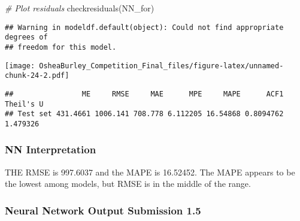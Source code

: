 \documentclass[
]{article}
\newenvironment{Shaded}{\begin{snugshade}}{\end{snugshade}}
\newcommand{\CommentTok}[1]{\textcolor[rgb]{0.56,0.35,0.01}{\textit{#1}}}
\newcommand{\FunctionTok}[1]{\textcolor[rgb]{0.00,0.00,0.00}{#1}}
\newcommand{\NormalTok}[1]{#1}
\newcommand{\OtherTok}[1]{\textcolor[rgb]{0.56,0.35,0.01}{#1}}
\newcommand{\SpecialCharTok}[1]{\textcolor[rgb]{0.00,0.00,0.00}{#1}}
\begin{document}
\begin{Shaded}
\begin{Highlighting}[]
\CommentTok{\# Plot residuals}
\FunctionTok{checkresiduals}\NormalTok{(NN\_for)}
\end{Highlighting}
\end{Shaded}

\begin{verbatim}
## Warning in modeldf.default(object): Could not find appropriate degrees of
## freedom for this model.
\end{verbatim}

\texttt{[image: OsheaBurley\_Competition\_Final\_files/figure-latex/unnamed-chunk-24-2.pdf]}

\begin{Shaded}
\end{Shaded}

\begin{verbatim}
##                ME     RMSE     MAE      MPE     MAPE      ACF1 Theil's U
## Test set 431.4661 1006.141 708.778 6.112205 16.54868 0.8094762  1.479326
\end{verbatim}

\begin{Shaded}
\end{Shaded}

\hypertarget{nn-interpretation}{%
\subsubsection{NN Interpretation}\label{nn-interpretation}}

THE RMSE is 997.6037 and the MAPE is 16.52452. The MAPE appears to be
the lowest among models, but RMSE is in the middle of the range.

\hypertarget{neural-network-output-submission-1.5}{%
\subsubsection{Neural Network Output Submission
1.5}\label{neural-network-output-submission-1.5}}
\end{document}
